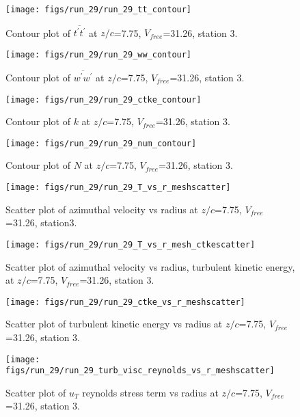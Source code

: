 \begin{figure}[H]
\centering
\texttt{[image: figs/run\_29/run\_29\_tt\_contour]}
\caption{Contour plot of $\overline{t^\prime t^\prime}$ at $z/c$=7.75, $V_{free}$=31.26, station 3.}
\end{figure}


\begin{figure}[H]
\centering
\texttt{[image: figs/run\_29/run\_29\_ww\_contour]}
\caption{Contour plot of $\overline{w^\prime w^\prime}$ at $z/c$=7.75, $V_{free}$=31.26, station 3.}
\end{figure}


\begin{figure}[H]
\centering
\texttt{[image: figs/run\_29/run\_29\_ctke\_contour]}
\caption{Contour plot of $k$ at $z/c$=7.75, $V_{free}$=31.26, station 3.}
\end{figure}


\begin{figure}[H]
\centering
\texttt{[image: figs/run\_29/run\_29\_num\_contour]}
\caption{Contour plot of $N$ at $z/c$=7.75, $V_{free}$=31.26, station 3.}
\end{figure}


\begin{figure}[H]
\centering
\texttt{[image: figs/run\_29/run\_29\_T\_vs\_r\_meshscatter]}
\caption{Scatter plot of azimuthal velocity vs radius at $z/c$=7.75, $V_{free}$=31.26, station3.}
\end{figure}


\begin{figure}[H]
\centering
\texttt{[image: figs/run\_29/run\_29\_T\_vs\_r\_mesh\_ctkescatter]}
\caption{Scatter plot of azimuthal velocity vs radius, turbulent kinetic energy, at $z/c$=7.75, $V_{free}$=31.26, station 3.}
\end{figure}


\begin{figure}[H]
\centering
\texttt{[image: figs/run\_29/run\_29\_ctke\_vs\_r\_meshscatter]}
\caption{Scatter plot of turbulent kinetic energy vs radius at $z/c$=7.75, $V_{free}$=31.26, station 3.}
\end{figure}


\begin{figure}[H]
\centering
\texttt{[image: figs/run\_29/run\_29\_turb\_visc\_reynolds\_vs\_r\_meshscatter]}
\caption{Scatter plot of $
u_T$ reynolds stress term vs radius at $z/c$=7.75, $V_{free}$=31.26, station 3.}
\end{figure}


